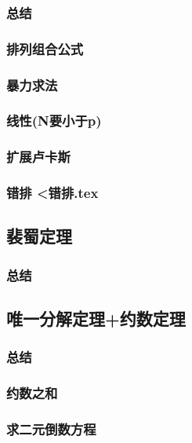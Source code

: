 \documentclass[10pt,a4paper]{article}
\begin{document}
\subsubsection{总结}

\subsubsection{排列组合公式}

\subsubsection{暴力求法}

\subsubsection{线性(N要小于p)}

\subsubsection{扩展卢卡斯}

\subsubsection{错排 <错排.tex}
\subsection{裴蜀定理}
\subsubsection{总结}

\subsection{唯一分解定理+约数定理}
\subsubsection{总结}

\subsubsection{约数之和}

\subsubsection{求二元倒数方程}

\end{document}
